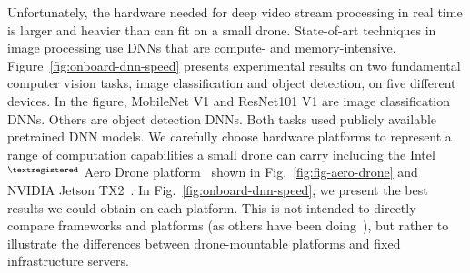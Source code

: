 Unfortunately, the hardware needed for deep video stream processing in real time
is larger and heavier than can fit on a small drone. State-of-art techniques in
image processing use DNNs that are compute- and memory-intensive.
Figure~\ref{fig:onboard-dnn-speed} presents experimental results on two
fundamental computer vision tasks, image classification and object detection, on
five different devices. In the figure, MobileNet V1 and ResNet101 V1 are image
classification DNNs. Others are object detection DNNs. Both tasks used publicly
available pretrained DNN models. We carefully choose hardware platforms to
represent a range of computation capabilities a small drone can carry including
the Intel$^{\tiny\textregistered}$ Aero Drone platform~\cite{Aero2018} shown in
Fig.~\ref{fig:fig-aero-drone} and NVIDIA Jetson TX2~\cite{NvidiaJetsonTeal}. In
Fig.~\ref{fig:onboard-dnn-speed}, we present the best results we could obtain on
each platform. This is not intended to directly compare frameworks
and platforms (as others have been doing~\cite{Zhang2018pcamp}), but rather
to illustrate the differences between drone-mountable platforms and fixed
infrastructure servers. 

